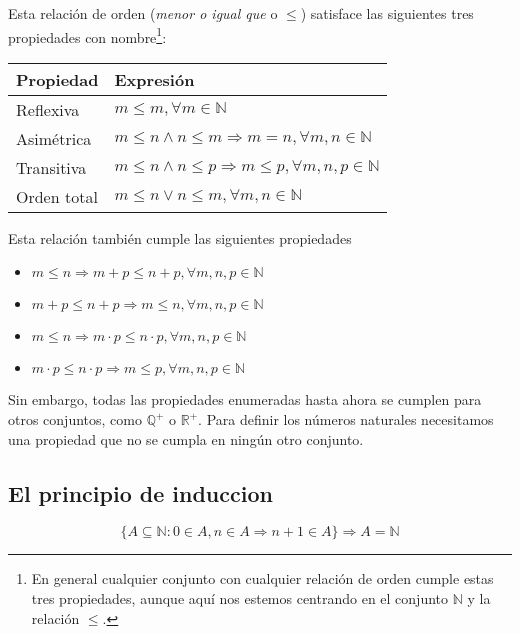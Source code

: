Esta relación de orden (\textit{menor o igual que} o $\leq$) satisface las siguientes tres propiedades con nombre\footnote{%
	En general cualquier conjunto con cualquier relación de orden cumple estas tres propiedades, aunque aquí nos estemos centrando en el conjunto $\mathbb{N}$ y la relación $\leq$.
}:

\begin{center}
\begin{tabular}{l l}
	\textbf{Propiedad} & \textbf{Expresión}                                                          \\
	\toprule
	Reflexiva          & $m \leq m, \forall m \in\mathbb{N}$                                         \\
	Asimétrica         & $m \leq n \land n \leq m \Rightarrow m=n, \forall m,n \in\mathbb{N}$        \\
	Transitiva         & $m \leq n \land n \leq p \Rightarrow m \leq p, \forall m,n,p \in\mathbb{N}$ \\
	Orden total        & $m \leq n \lor n \leq m, \forall m,n \in\mathbb{N}$                         \\
\end{tabular}
\end{center}

Esta relación también cumple las siguientes propiedades

\begin{itemize}
	\item $m \leq n \Rightarrow m+p \leq n+p, \forall m,n,p \in\mathbb{N}$
	\item $m+p \leq n+p \Rightarrow m \leq n, \forall m,n,p \in\mathbb{N}$
	\item $m \leq n \Rightarrow m \cdot p \leq n \cdot p, \forall m,n,p \in\mathbb{N}$
	\item $m \cdot p \leq n \cdot p \Rightarrow m \leq p, \forall m,n,p \in\mathbb{N}$
\end{itemize}

Sin embargo, todas las propiedades enumeradas hasta ahora se cumplen para otros conjuntos, como $\mathbb{Q}^+$ o $\mathbb{R}^+$.
Para definir los números naturales necesitamos una propiedad que no se cumpla en ningún otro conjunto.

\subsection{El principio de induccion}\label{el-principio-de-induccion}

\[\{A \subseteq \mathbb{N} : 0 \in A, n \in A \Rightarrow n+1 \in A\} \Rightarrow A = \mathbb{N}\]

